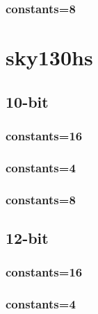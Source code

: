 \documentclass{article}
\begin{document}
\subsubsection*{constants=8}
\begin{figure}[H]
\centering
\resizebox{0.95\linewidth}{!}{}
\end{figure}
\section*{sky130hs}
\subsection*{10-bit}
\subsubsection*{constants=16}
\begin{figure}[H]
\centering
\resizebox{0.95\linewidth}{!}{}
\end{figure}
\subsubsection*{constants=4}
\begin{figure}[H]
\centering
\resizebox{0.95\linewidth}{!}{}
\end{figure}
\subsubsection*{constants=8}
\begin{figure}[H]
\centering
\resizebox{0.95\linewidth}{!}{}
\end{figure}
\subsection*{12-bit}
\subsubsection*{constants=16}
\begin{figure}[H]
\centering
\resizebox{0.95\linewidth}{!}{}
\end{figure}
\subsubsection*{constants=4}
\begin{figure}[H]
\centering
\resizebox{0.95\linewidth}{!}{}
\end{figure}
\end{document}

